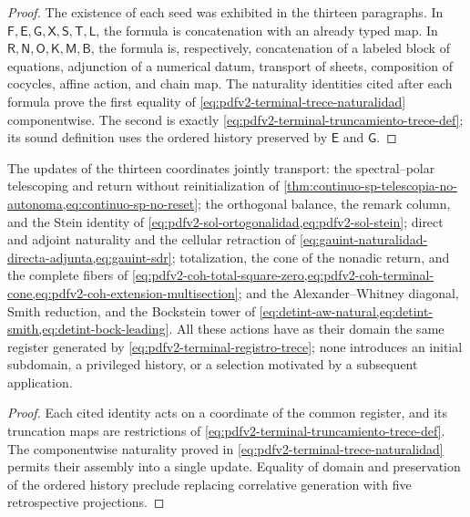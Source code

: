 \begin{proof}
The existence of each seed was exhibited in the thirteen paragraphs. In
\(\mathsf F,\mathsf E,\mathsf G,\mathsf X,\mathsf S,\mathsf T,\mathsf L\),
the formula is concatenation with an already typed map. In
\(\mathsf R,\mathsf N,\mathsf O,\mathsf K,\mathsf M,\mathsf B\), the
formula is, respectively, concatenation of a labeled block of equations,
adjunction of a numerical datum, transport of sheets, composition
of cocycles, affine action, and chain map. The naturality identities
cited after each formula prove the first equality of
\eqref{eq:pdfv2-terminal-trece-naturalidad} componentwise. The
second is exactly
\eqref{eq:pdfv2-terminal-truncamiento-trece-def}; its sound definition uses the
ordered history preserved by \(\mathsf E\) and \(\mathsf G\).
\end{proof}

\begin{proposition}
\label{prop:pdfv2-terminal-cinco-desarrollos-integrales}
The updates of the thirteen coordinates jointly transport:
the spectral--polar telescoping and return without reinitialization of
\cref{thm:continuo-sp-telescopia-no-autonoma,eq:continuo-sp-no-reset};
the orthogonal balance, the remark column, and the Stein identity of
\cref{eq:pdfv2-sol-ortogonalidad,eq:pdfv2-sol-stein}; direct
and adjoint naturality and the cellular retraction of
\cref{eq:gauint-naturalidad-directa-adjunta,eq:gauint-sdr}; totalization,
the cone of the nonadic return, and the complete fibers of
\cref{eq:pdfv2-coh-total-square-zero,eq:pdfv2-coh-terminal-cone,eq:pdfv2-coh-extension-multisection}; and the Alexander--Whitney
diagonal, Smith reduction, and the Bockstein tower of
\cref{eq:detint-aw-natural,eq:detint-smith,eq:detint-bock-leading}.
All these actions have as their domain the same register generated by
\eqref{eq:pdfv2-terminal-registro-trece}; none introduces an initial
subdomain, a privileged history, or a selection motivated by a subsequent
application.
\end{proposition}

\begin{proof}
Each cited identity acts on a coordinate of the common register, and its truncation maps are restrictions of \eqref{eq:pdfv2-terminal-truncamiento-trece-def}. The componentwise naturality proved in \eqref{eq:pdfv2-terminal-trece-naturalidad} permits their assembly into a single update. Equality of domain and preservation of the ordered history preclude replacing correlative generation with five retrospective projections.
\end{proof}

